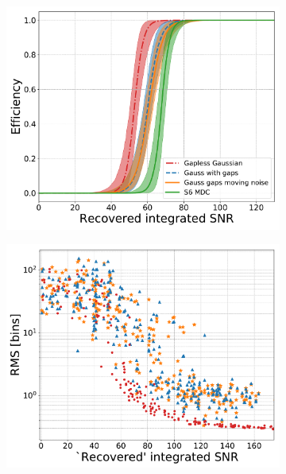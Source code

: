 \begin{figure}[p]
\centering
\begin{subfigure}[h]{0.49\columnwidth}
\centering
\includegraphics[scale=0.3]{C3_soap/s6_efficiency_snr.pdf}
\subcaption{}
\label{gausss6:eff_snr}
\end{subfigure}
\begin{subfigure}[h]{0.49\columnwidth}
\includegraphics[scale=0.3]{C3_soap/gauss_s6_frac_snr.pdf}
\subcaption{}
\label{gausss6:res_snr}
\end{subfigure}


\end{figure}
